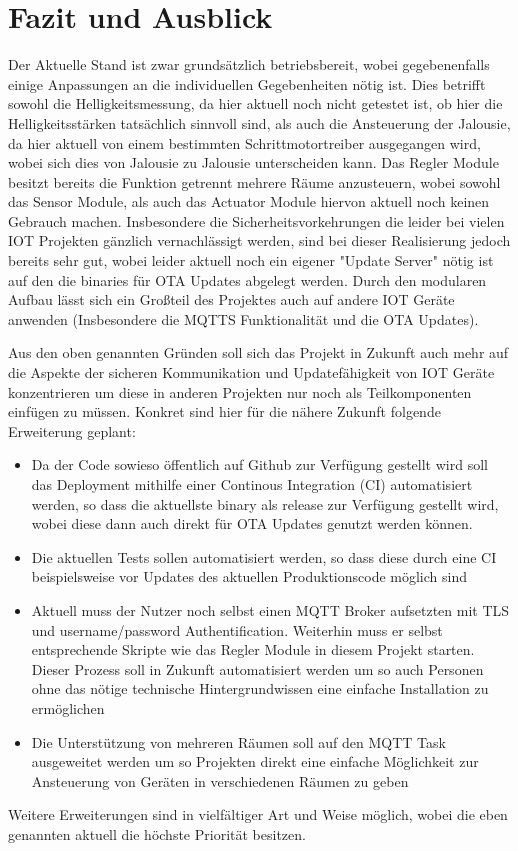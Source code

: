 \chapter{Fazit und Ausblick}
\label{cha:Fazit und Ausblick}

Der Aktuelle Stand ist zwar grundsätzlich betriebsbereit, wobei gegebenenfalls einige Anpassungen an die individuellen Gegebenheiten nötig ist. Dies betrifft sowohl die Helligkeitsmessung, da hier aktuell noch nicht getestet ist, ob hier die Helligkeitsstärken tatsächlich sinnvoll sind, als auch die Ansteuerung der Jalousie, da hier aktuell von einem bestimmten Schrittmotortreiber ausgegangen wird, wobei sich dies von Jalousie zu Jalousie unterscheiden kann. Das Regler Module besitzt bereits die Funktion getrennt mehrere Räume anzusteuern, wobei sowohl das Sensor Module, als auch das Actuator Module hiervon aktuell noch keinen Gebrauch machen. Insbesondere die Sicherheitsvorkehrungen die leider bei vielen IOT Projekten gänzlich vernachlässigt werden, sind bei dieser Realisierung jedoch bereits sehr gut, wobei leider aktuell noch ein eigener "Update Server" nötig ist auf den die binaries für OTA Updates abgelegt werden. Durch den modularen Aufbau lässt sich ein Großteil des Projektes auch auf andere IOT Geräte anwenden (Insbesondere die MQTTS Funktionalität und die OTA Updates).

Aus den oben genannten Gründen soll sich das Projekt in Zukunft auch mehr auf die Aspekte der sicheren Kommunikation und Updatefähigkeit von IOT Geräte konzentrieren um diese in anderen Projekten nur noch als Teilkomponenten einfügen zu müssen. Konkret sind hier für die nähere Zukunft folgende Erweiterung geplant:

\begin{itemize}
	\item Da der Code sowieso öffentlich auf Github zur Verfügung gestellt wird soll das Deployment mithilfe einer Continous Integration (CI) automatisiert werden, so dass die aktuellste binary als release zur Verfügung gestellt wird, wobei diese dann auch direkt für OTA Updates genutzt werden können.
	\item Die aktuellen Tests sollen automatisiert werden, so dass diese durch eine CI beispielsweise vor Updates des aktuellen Produktionscode möglich sind
	\item Aktuell muss der Nutzer noch selbst einen MQTT Broker aufsetzten mit TLS und username/password Authentification. Weiterhin muss er selbst entsprechende Skripte wie das Regler Module in diesem Projekt starten. Dieser Prozess soll in Zukunft automatisiert werden um so auch Personen ohne das nötige technische Hintergrundwissen eine einfache Installation zu ermöglichen
	\item Die Unterstützung von mehreren Räumen soll auf den MQTT Task ausgeweitet werden um so Projekten direkt eine einfache Möglichkeit zur Ansteuerung von Geräten in verschiedenen Räumen zu geben
\end{itemize}

Weitere Erweiterungen sind in vielfältiger Art und Weise möglich, wobei die eben genannten aktuell die höchste Priorität besitzen.
